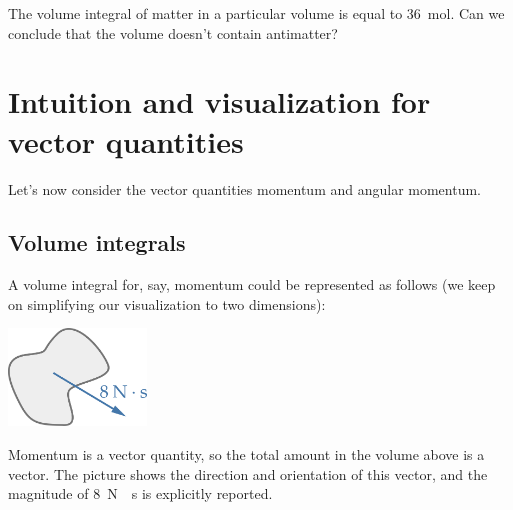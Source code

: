 \documentclass[a4paper,12pt,%
onecolumn,oneside,titlepage,%
british%
]{memoir}
\newcommand{\mynotew}[1]{{\footnotesize\color{midgrey}\faIcon{tools}\ #1}}
\renewcommand*{\|}[1][]{\nonscript\:#1\vert\nonscript\:\mathopen{}}
\begin{document}
\bigskip

% 
\begin{exercise}
  The volume integral of matter in a particular volume is equal to \qty{36}{mol}. Can we conclude that the volume doesn't contain antimatter?
\end{exercise}




\section{Intuition and visualization for vector quantities}
\label{sec:intuition_vector}

Let's now consider the vector quantities momentum and angular momentum.

\subsection{Volume integrals}
A volume integral for, say, momentum could be represented as follows (we keep on simplifying our visualization to two dimensions):
\begin{center}
  \includegraphics[height=7em]{volumeintegral_8Ns.pdf}
\end{center}
Momentum is a vector quantity, so the total amount in the volume above is a vector. The picture shows the direction and orientation of this vector, and the magnitude of \textcolor{bluepurple}{\qty{8}{N\cdot s}}
is explicitly reported.
\end{document}
